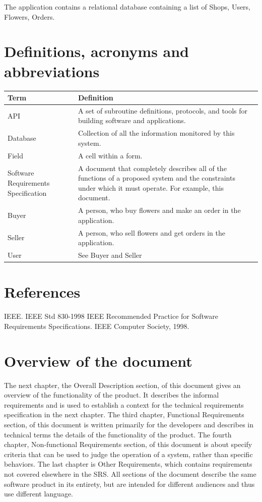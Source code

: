 \documentclass{scrreprt}
\begin{document}
The application contains a relational database containing a list of Shops, Users, Flowers, Orders.

\section{ Definitions, acronyms and abbreviations}
\begin{tabular}{| m{4cm} | m{10cm} |}
	\hline
	\textbf{Term} & \textbf{Definition} \\ \hline
	API & A set of subroutine definitions, protocols, and tools for building software and applications.  \\ \hline
	Database &  Collection of all the information monitored by this system.\\ \hline
	Field  & A cell within a form. \\ \hline
	Software Requirements Specification & 
	A document that completely describes all of the functions of a proposed system and the constraints under which it must operate. For example, this document. \\ \hline
	Buyer & A person, who buy flowers and make an order in the application. \\ \hline
	Seller & A person, who sell flowers and get orders in the application. \\ \hline
	User & See Buyer and Seller\\
	\hline
\end{tabular}

\section{References}
IEEE. IEEE Std 830-1998 IEEE Recommended Practice for Software Requirements Specifications. IEEE Computer Society, 1998.

\section{Overview of the document}
The next chapter, the Overall Description section, of this document gives an overview of the functionality of the product. It describes the informal requirements and is used to establish a context for the technical requirements specification in the next chapter.
The third chapter, Functional Requirements section, of this document is written primarily for the developers and describes in technical terms the details of the functionality of the product.
The fourth chapter, Non-functional Requirements section, of this document is about specify criteria that can be used to judge the operation of a system, rather than specific behaviors.
The last chapter is Other Requirements, which contains  requirements not covered elsewhere in the SRS.
All sections of the document describe the same software product in its entirety, but are intended for different audiences and thus use different language.
\end{document}
